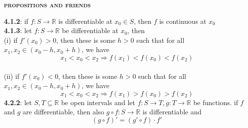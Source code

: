 \documentclass[a4paper]{article}
\begin{document}
\begin{multicols}{2}
\begin{framed}
\end{framed}

\begin{framed}
	\begin{center}
		\textbf{\textsc{propositions and friends}}
	\end{center}
	\textbf{4.1.2}: if $f:S \rightarrow \mathbb{R}$ is differentiable at $x_0 \in S$, then $f$ is continuous at $x_0$\\
	\textbf{4.1.3}: let $f:S \rightarrow \mathbb{R}$ be differentiable at $x_0$, then\\
	(i) if $f'(x_0) > 0$, then these is some $h > 0$ such that for all $x_1, x_2 \in (x_0 - h, x_0 + h)$, we have $$x_1 < x_0 < x_2 \Rightarrow f(x_1) < f(x_0) < f(x_2)$$\\
	(ii) if $f'(x_0) < 0$, then these is some $h > 0$ such that for all $x_1, x_2 \in (x_0 - h, x_0 + h)$, we have $$x_1 < x_0 < x_2 \Rightarrow f(x_1) > f(x_0) > f(x_2)$$
	\textbf{4.2.2}: let $S, T \subseteq \mathbb{R}$ be open intervals and let $f:S \rightarrow T,g:T \rightarrow \mathbb{R}$ be functions. if $f$ and $g$ are differentiable, then also $g \circ f : S \rightarrow \mathbb{R}$ is differentiable and
	$$(g \circ f)' = (g' \circ f) \cdot f'$$
\end{framed}

\end{multicols}
\end{document}
